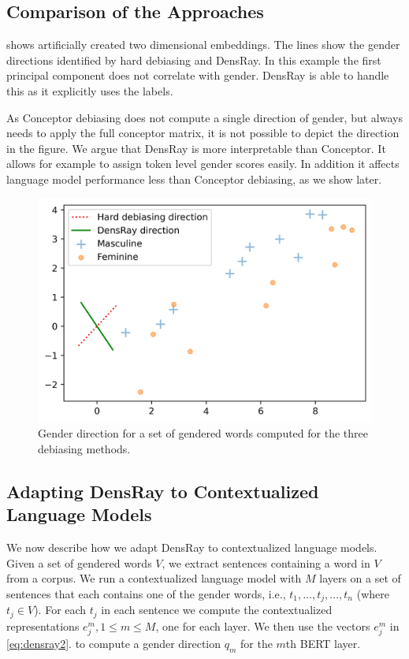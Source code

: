 \subsection{Comparison of the Approaches}
  shows artificially created two dimensional embeddings. The lines show the gender directions identified by hard debiasing and DensRay. In this example
 the first principal component does not correlate with gender. DensRay is able to handle this as it explicitly uses the labels.
 
As Conceptor debiasing does not compute a single direction of gender, but always needs to apply the full conceptor matrix, it is not possible to depict the direction in the figure. 
We argue that DensRay is more interpretable than Conceptor. It allows for example to assign token level gender scores easily. In addition it affects language model performance less than Conceptor debiasing, as we show later.
\begin{figure}[h]
	\centering
	\includegraphics[width=0.4\linewidth]{examples.png}
	\caption{Gender direction for a set of gendered
          words computed for the three debiasing methods.}
\end{figure}

\subsection{Adapting DensRay to Contextualized Language Models}
We now describe how we adapt DensRay to contextualized
language models. Given a set of gendered words
$V$, we extract sentences containing a word in $V$ from a
corpus. We run a contextualized language model
with $M$ layers
on a set of 
sentences that each contains one of the gender words, i.e., 
$t_1,\ldots,t_j,\ldots,t_n$ (where $t_j \in V$). 
For each $t_j $ in each sentence we  compute the contextualized representations $e_j^m, 1\leq m
\leq M$, one for each layer. We then use the vectors $e_j^m$ in \eqref{eq:densray2}.
to compute a gender direction
$q_m$ for the $m$th BERT layer. 
